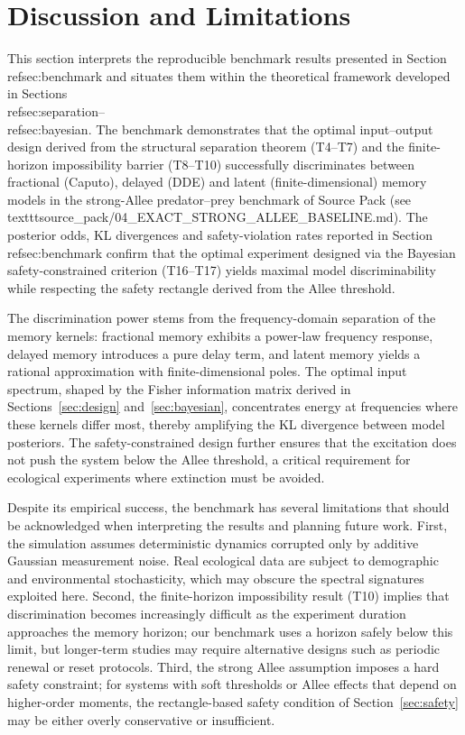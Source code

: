 \section{Discussion and Limitations}
\label{sec:discussion}

This section interprets the reproducible benchmark results presented in Section~\\ref{sec:benchmark} and situates them within the theoretical framework developed in Sections~\\ref{sec:separation}--\\ref{sec:bayesian}.  The benchmark demonstrates that the optimal input--output design derived from the structural separation theorem (T4--T7) and the finite-horizon impossibility barrier (T8--T10) successfully discriminates between fractional (Caputo), delayed (DDE) and latent (finite-dimensional) memory models in the strong-Allee predator--prey benchmark of Source Pack (see \\texttt{source\_pack/04\_EXACT\_STRONG\_ALLEE\_BASELINE.md}).  The posterior odds, KL divergences and safety-violation rates reported in Section~\\ref{sec:benchmark} confirm that the optimal experiment designed via the Bayesian safety-constrained criterion (T16--T17) yields maximal model discriminability while respecting the safety rectangle derived from the Allee threshold.

The discrimination power stems from the frequency-domain separation of the memory kernels: fractional memory exhibits a power-law frequency response, delayed memory introduces a pure delay term, and latent memory yields a rational approximation with finite-dimensional poles.  The optimal input spectrum, shaped by the Fisher information matrix derived in Sections~\ref{sec:design} and~\ref{sec:bayesian}, concentrates energy at frequencies where these kernels differ most, thereby amplifying the KL divergence between model posteriors.  The safety-constrained design further ensures that the excitation does not push the system below the Allee threshold, a critical requirement for ecological experiments where extinction must be avoided.

Despite its empirical success, the benchmark has several limitations that should be acknowledged when interpreting the results and planning future work.  First, the simulation assumes deterministic dynamics corrupted only by additive Gaussian measurement noise.  Real ecological data are subject to demographic and environmental stochasticity, which may obscure the spectral signatures exploited here.  Second, the finite-horizon impossibility result (T10) implies that discrimination becomes increasingly difficult as the experiment duration approaches the memory horizon; our benchmark uses a horizon safely below this limit, but longer-term studies may require alternative designs such as periodic renewal or reset protocols.  Third, the strong Allee assumption imposes a hard safety constraint; for systems with soft thresholds or Allee effects that depend on higher-order moments, the rectangle-based safety condition of Section~\ref{sec:safety} may be either overly conservative or insufficient.

